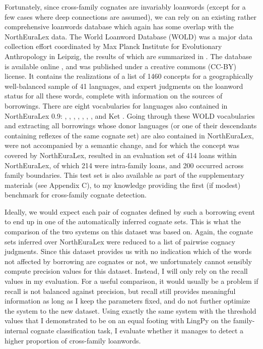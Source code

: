Fortunately, since cross-family cognates are invariably loanwords (except for a few cases where deep connections are assumed), we can rely on an existing rather comprehensive loanwords database which again has some overlap with the NorthEuraLex data. The World Loanword Database (WOLD) was a major data collection effort coordinated by Max Planck Institute for Evolutionary Anthropology in Leipzig, the results of which are summarized in \cite{tadmor2009}. The database is available online \citep{wold}, and was published under a creative commons (CC-BY) license. It contains the realizations of a list of 1460 concepts for a geographically well-balanced sample of 41 languages, and expert judgments on the loanword status for all these words, complete with information on the sources of borrowings. There are eight vocabularies for languages also contained in NorthEuraLex 0.9:  \citep{wold-eng},  \citep{wold-nld},  \citep{wold-ron},  \citep{wold-sjd},  \citep{wold-sah},  \citep{wold-jpn},  \citep{wold-cmn}, and Ket \citep{wold-ket}. Going through these WOLD vocabularies and extracting all borrowings whose donor languages (or one of their descendants containing reflexes of the same cognate set) are also contained in NorthEuraLex, were not accompanied by a semantic change, and for which the concept was covered by NorthEuraLex, resulted in an evaluation set of 414 loans within NorthEuraLex, of which 214 were intra-family loans, and 200 occurred across family boundaries. This test set is also available as part of the supplementary materials (see Appendix C), to my knowledge providing the first (if modest) benchmark for cross-family cognate detection.

Ideally, we would expect each pair of cognates defined by such a borrowing event to end up in one of the automatically inferred cognate sets. This is what the comparison of the two systems on this dataset was based on. Again, the cognate sets inferred over NorthEuraLex were reduced to a list of pairwise cognacy judgments. Since this dataset provides us with no indication which of the words not affected by borrowing are cognates or not, we unfortunately cannot sensibly compute precision values for this dataset. Instead, I will only rely on the recall values in my evaluation. For a useful comparison, it would usually be a problem if recall is not balanced against precision, but recall still provides meaningful information as long as I keep the parameters fixed, and do not further optimize the system to the new dataset. Using exactly the same system with the threshold values that I demonstrated to be on an equal footing with LingPy on the family-internal cognate classification task, I evaluate whether it manages to detect a higher proportion of cross-family loanwords.

